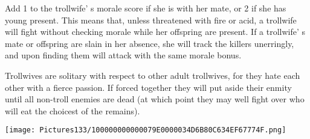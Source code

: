 \documentclass[a4paper,twoside,openany,10pt]{book}
\begin{document}
\begin{multicols}{2}
Add 1 to the trollwife' s morale score if she is with her mate, or 2 if she has young present. This means that, unless threatened with fire or acid, a trollwife will fight without checking morale while her offspring are present. If a trollwife' s mate or offspring are slain in her absence, she will track the killers unerringly, and upon finding them will attack with the same morale bonus.

Trollwives are solitary with respect to other adult trollwives, for they hate each other with a fierce passion. If forced together they will put aside their enmity until all non-troll enemies are dead (at which point they may well fight over who will eat the choicest of the remains). 

\end{multicols}

\begin{center} \texttt{[image: Pictures133/100000000000079E0000034D6B80C634EF67774F.png]} \end{center}
\end{document}
